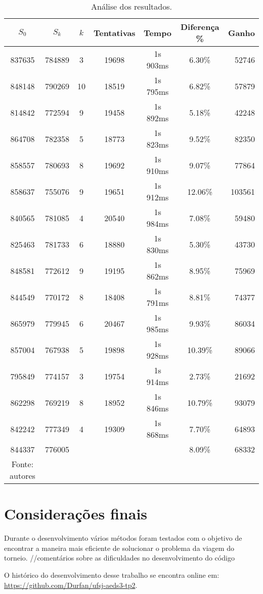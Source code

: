 \documentclass[12pt,a4paper]{article}
\begin{document}
\begin{table}[H]
	\centering
	\caption{Análise dos resultados.}
	\label{tab:resultados}
	\vspace{0.2cm}
	\begin{tabular}{ccccccr}
		\toprule 
		$S_{0}$ & $S_{k}$ & $k$ & Tentativas & Tempo & Diferença \% & Ganho \\ 
		\midrule
		837635 & 784889 &  3 & 19698 & 1s 903ms &  6.30\% &  52746 \\
		848148 & 790269 & 10 & 18519 & 1s 795ms &  6.82\% &  57879 \\
		814842 & 772594 &  9 & 19458 & 1s 892ms &  5.18\% &  42248 \\
		864708 & 782358 &  5 & 18773 & 1s 823ms &  9.52\% &  82350 \\
		858557 & 780693 &  8 & 19692 & 1s 910ms &  9.07\% &  77864 \\
		858637 & 755076 &  9 & 19651 & 1s 912ms & 12.06\% & 103561 \\
		840565 & 781085 &  4 & 20540 & 1s 984ms &  7.08\% &  59480 \\
		825463 & 781733 &  6 & 18880 & 1s 830ms &  5.30\% &  43730 \\
		848581 & 772612 &  9 & 19195 & 1s 862ms &  8.95\% &  75969 \\
		844549 & 770172 &  8 & 18408 & 1s 791ms &  8.81\% &  74377 \\
		865979 & 779945 &  6 & 20467 & 1s 985ms &  9.93\% &  86034 \\
		857004 & 767938 &  5 & 19898 & 1s 928ms & 10.39\% &  89066 \\
		795849 & 774157 &  3 & 19754 & 1s 914ms &  2.73\% &  21692 \\
		862298 & 769219 &  8 & 18952 & 1s 846ms & 10.79\% &  93079 \\
		842242 & 777349 &  4 & 19309 & 1s 868ms &  7.70\% &  64893 \\
		\midrule
		844337 & 776005 &    &       &          &  8.09\% &  68332 \\
		\bottomrule
		\footnotesize Fonte: autores
	\end{tabular}
\end{table}

     


       


\section{Considerações finais}

Durante o desenvolvimento vários métodos foram testados com o objetivo de encontrar a maneira mais eficiente de solucionar o problema da viagem do torneio.
//comentários sobre as dificuldades no desenvolvimento do código

\pagebreak

\begin{flushleft}
	\nocite{*}
	
	\vfill
	O histórico do desenvolvimento desse trabalho se encontra online em:\\ \url{https://github.com/Durfan/ufsj-aeds3-tp2}.
\end{flushleft}
\end{document}

